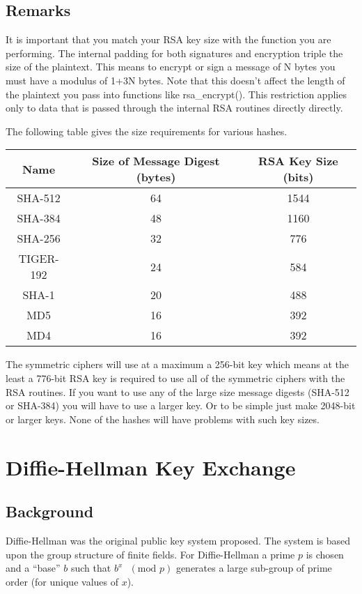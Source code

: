 \documentclass{book}
\begin{document}
\section{Remarks}
It is important that you match your RSA key size with the function you are performing.  The internal padding for both
signatures and encryption triple the size of the plaintext.  This means to encrypt or sign
a message of N bytes you must have a modulus of 1+3N bytes.  Note that this doesn't affect the length of the plaintext 
you pass into functions like rsa\_encrypt().  This restriction applies only to data that is passed through the
internal RSA routines directly directly.

The following table gives the size requirements for various hashes.
\begin{center}
\begin{tabular}{|c|c|c|}
      \hline Name & Size of Message Digest (bytes) & RSA Key Size (bits)\\
      \hline SHA-512 & 64 & 1544\\
      \hline SHA-384 & 48 & 1160 \\
      \hline SHA-256 & 32 & 776\\
      \hline TIGER-192 & 24 & 584\\
      \hline SHA-1 & 20 & 488\\
      \hline MD5 & 16 & 392\\
      \hline MD4 & 16 & 392\\
      \hline
\end{tabular}
\end{center}

The symmetric ciphers will use at a maximum a 256-bit key which means at the least a 776-bit RSA key is 
required to use all of the symmetric ciphers with the RSA routines. If you want to use any of the large size 
message digests (SHA-512 or SHA-384) you will have to use a larger key.  Or to be simple just make 2048-bit or larger
keys.  None of the hashes will have problems with such key sizes.

\chapter{Diffie-Hellman Key Exchange}

\section{Background}

Diffie-Hellman was the original public key system proposed.  The system is based upon the group structure
of finite fields.  For Diffie-Hellman a prime $p$ is chosen and a ``base'' $b$ such that $b^x\mbox{ }(\mbox{mod }p)$ 
generates a large sub-group of prime order (for unique values of $x$).
\end{document}
